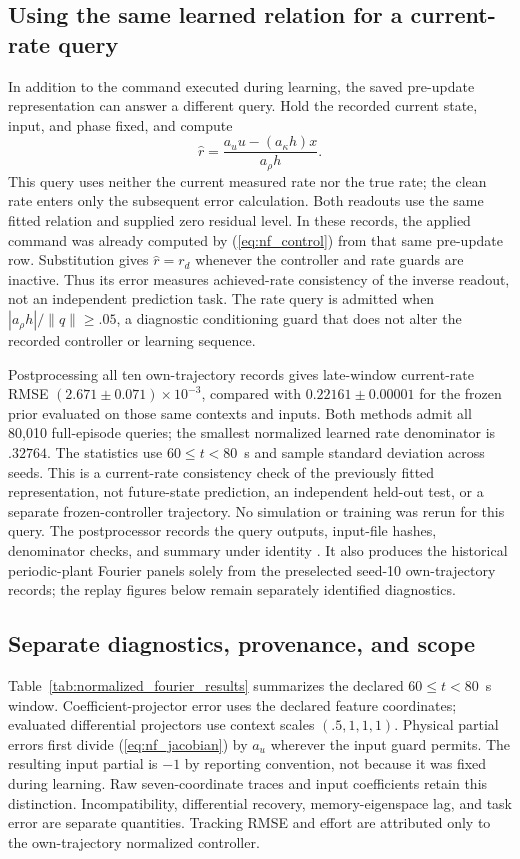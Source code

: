\subsection{Using the same learned relation for a current-rate query}
In addition to the command executed during learning, the saved pre-update
representation can answer a different query. Hold the recorded current
state, input, and phase fixed, and compute
\begin{equation}
 \widehat r=\frac{a_u u-(a_\kappa h)x}{a_\rho h}.
 \label{eq:nf_rate_completion}
\end{equation}
This query uses neither the current measured rate nor the true rate; the
clean rate enters only the subsequent error calculation. Both readouts use
the same fitted relation and supplied zero residual level. In these records,
the applied command was already computed by (\ref{eq:nf_control}) from
that same pre-update row. Substitution gives $\widehat r=r_d$ whenever
the controller and rate guards are inactive. Thus its error measures
achieved-rate consistency of the inverse readout, not an independent
prediction task. The rate query
is admitted when $|a_\rho h|/\|q\|\ge .05$, a diagnostic conditioning
guard that does not alter the recorded controller or learning sequence.

Postprocessing all ten own-trajectory records gives late-window current-rate
RMSE $(2.671\pm0.071)\times10^{-3}$, compared with
$0.22161\pm0.00001$ for the frozen prior evaluated on those same contexts
and inputs. Both methods admit all 80,010 full-episode queries; the smallest
normalized learned rate denominator is $.32764$. The statistics use
$60\le t<80$~s and sample standard deviation across seeds. This is
a current-rate consistency check of the previously fitted representation,
not future-state prediction, an independent held-out test, or a separate
frozen-controller trajectory. No simulation or training was rerun for this
query. The postprocessor 
records the query outputs, input-file hashes, denominator checks, and summary
under identity .
It also produces the historical periodic-plant Fourier panels solely from the
preselected seed-10 own-trajectory records; the replay figures below remain
separately identified diagnostics.

\subsection{Separate diagnostics, provenance, and scope}
Table~\ref{tab:normalized_fourier_results} summarizes the declared
$60\le t<80$~s window. Coefficient-projector error uses the declared feature
coordinates; evaluated differential projectors use context scales
$(.5,1,1,1)$. Physical partial errors first divide (\ref{eq:nf_jacobian})
by $a_u$ wherever the input guard permits. The resulting input partial is
$-1$ by reporting convention, not because it was fixed during learning.
Raw seven-coordinate traces and input coefficients retain this distinction.
Incompatibility, differential recovery, memory-eigenspace lag, and task error
are separate quantities. Tracking RMSE and effort are attributed only to the
own-trajectory normalized controller.

